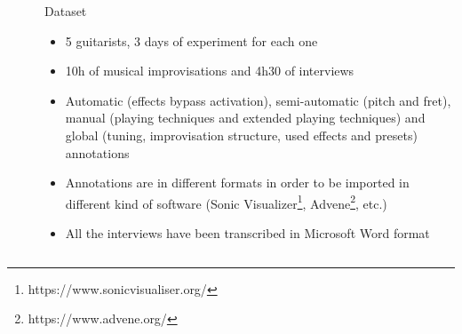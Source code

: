 \documentclass[final]{beamer}
\newlength{\sepwid}
\newlength{\onecolwid}
\begin{document}
\begin{frame}[t]
\begin{columns}[t]
\begin{column}{\onecolwid}
\end{column} %

\begin{column}{\sepwid}\end{column} %



\begin{column}{\onecolwid} %


\begin{block}{Dataset}


\begin{itemize}
    \item 5 guitarists, 3 days of experiment for each one
    \item 10h of musical improvisations and 4h30 of interviews
    \item Automatic (effects bypass activation), semi-automatic (pitch and fret), manual  (playing techniques and extended playing techniques) and global (tuning, improvisation structure, used effects and presets) annotations
    \item Annotations are in different formats in order to be imported in different kind of software (Sonic Visualizer\footnote{https://www.sonicvisualiser.org/}, Advene\footnote{https://www.advene.org/}, etc.)
    \item All the interviews have been transcribed in Microsoft Word format
\end{itemize}



\end{block}
\end{column}
\end{columns}
\end{frame}
\end{document}
